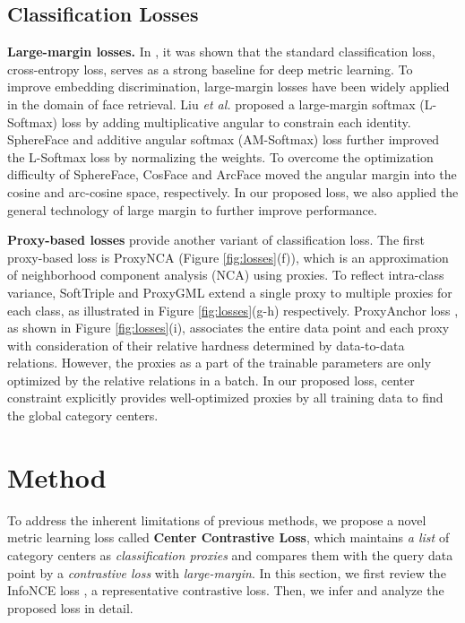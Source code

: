 \documentclass[10pt,twocolumn,letterpaper]{article}
\begin{document}
\subsection{Classification Losses}

\textbf{Large-margin losses.} In \cite{nsoftmax,ce}, it was shown that the standard classification loss, cross-entropy loss, serves as a strong baseline for deep metric learning. To improve embedding discrimination, large-margin losses have been widely applied in the domain of face retrieval. Liu \textit{et al.} \cite{lsoftmax} proposed a large-margin softmax (L-Softmax) loss by adding multiplicative angular to constrain each identity. SphereFace \cite{sphereface} and additive angular softmax (AM-Softmax) loss \cite{amsoftmax} further improved the L-Softmax loss by normalizing the weights. To overcome the optimization difficulty of SphereFace, CosFace \cite{cosface} and ArcFace \cite{arcface} moved the angular margin into the cosine and arc-cosine space, respectively. In our proposed loss, we also applied the general technology of large margin to further improve performance.

\textbf{Proxy-based losses} provide another variant of classification loss. The first proxy-based loss is ProxyNCA \cite{proxynca} (Figure \ref{fig:losses}(f)), which is an approximation of neighborhood component analysis (NCA) using proxies. To reflect intra-class variance, SoftTriple \cite{softtriple} and ProxyGML \cite{proxygml} extend a single proxy to multiple proxies for each class, as illustrated in Figure \ref{fig:losses}(g-h) respectively. ProxyAnchor loss \cite{proxyanchor}, as shown in Figure \ref{fig:losses}(i), associates the entire data point and each proxy with consideration of their relative hardness determined by data-to-data relations. However, the proxies as a part of the trainable parameters are only optimized by the relative relations in a batch. In our proposed loss, center constraint explicitly provides well-optimized proxies by all training data to find the global category centers. 

\section{Method}\label{sec:method}

To address the inherent limitations of previous methods, we propose a novel metric learning loss called \textbf{Center Contrastive Loss}, which maintains \textit{a list} of category centers as \textit{classification proxies} and compares them with the query data point by a \textit{contrastive loss} with \textit{large-margin}. In this section, we first review the InfoNCE loss \cite{infonce}, a representative contrastive loss. Then, we infer and analyze the proposed loss in detail.
\end{document}
